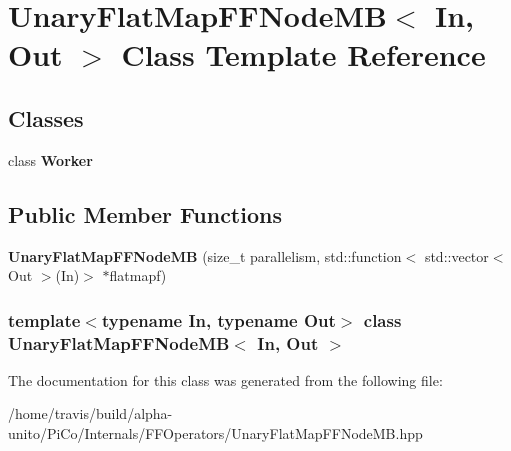 \hypertarget{class_unary_flat_map_f_f_node_m_b}{\section{\-Unary\-Flat\-Map\-F\-F\-Node\-M\-B$<$ \-In, \-Out $>$ \-Class \-Template \-Reference}
\label{class_unary_flat_map_f_f_node_m_b}
}
\subsection*{\-Classes}
\begin{DoxyCompactItemize}
\item 
class {\bfseries \-Worker}
\end{DoxyCompactItemize}
\subsection*{\-Public \-Member \-Functions}
\begin{DoxyCompactItemize}
\item 
\hypertarget{class_unary_flat_map_f_f_node_m_b_a676ccfc120cef3d25fef6f2a39508f1d}{{\bfseries \-Unary\-Flat\-Map\-F\-F\-Node\-M\-B} (size\-\_\-t parallelism, std\-::function$<$ std\-::vector$<$ \-Out $>$(\-In)$>$ $\ast$flatmapf)}\label{class_unary_flat_map_f_f_node_m_b_a676ccfc120cef3d25fef6f2a39508f1d}

\end{DoxyCompactItemize}
\subsubsection*{template$<$typename \-In, typename \-Out$>$ class Unary\-Flat\-Map\-F\-F\-Node\-M\-B$<$ In, Out $>$}



\-The documentation for this class was generated from the following file\-:\begin{DoxyCompactItemize}
\item 
/home/travis/build/alpha-\/unito/\-Pi\-Co/\-Internals/\-F\-F\-Operators/\-Unary\-Flat\-Map\-F\-F\-Node\-M\-B.\-hpp\end{DoxyCompactItemize}
